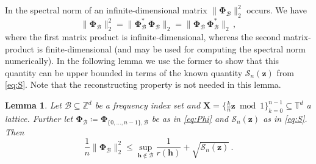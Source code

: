 \documentclass[a4paper]{amsart}
\newtheorem{lemma}[theorem]{Lemma}
\newcommand{\modone}{\bmod{}1}
\begin{document}
In  the spectral norm of an infinite-dimensional matrix $\|\bm\Phi_{\mathcal B}\|_{2}^{2}$ occurs.
We have
\begin{equation*}
    \|\bm\Phi_{\mathcal B}\|_{2}^{2} =\| \bm\Phi_{\mathcal B}^\ast \, \bm\Phi_{\mathcal B} \|_{2} = \| \bm\Phi_{\mathcal B} \, \bm\Phi_{\mathcal B}^\ast \|_{2} \,,
\end{equation*}
where the first matrix product is infinite-dimensional, whereas the second matrix-product is finite-dimensional (and may be used for computing the spectral norm numerically).
In the following lemma we use the former to show that this quantity can be upper bounded in terms of the known quantity $\mathcal S_n(\bm z)$ from \eqref{eq:S}.
Note that the reconstructing property is not needed in this lemma.

\begin{lemma}\label{nokings} Let $\mathcal B\subseteq\mathds Z^d$ be a frequency index set and $\bm X = \{\frac kn \bm z\modone\}_{k=0}^{n-1}\subseteq\mathds T^d$ a lattice.
    Further let $\bm\Phi_{\mathcal B} \coloneqq \bm\Phi_{\{0,\dots,n-1\}, \mathcal B}$ be as in \eqref{eq:Phi} and $\mathcal S_n(\bm z)$ as in \eqref{eq:S}.
    Then
    \begin{equation*}
        \frac 1n \|\bm\Phi_{\mathcal B}\|_{2}^2
        \le \sup_{\bm h\notin\mathcal B} \frac{1}{r(\bm h)} + \sqrt{\mathcal S_n(\bm z)} \,.
    \end{equation*}
\end{lemma} 
\end{document}
